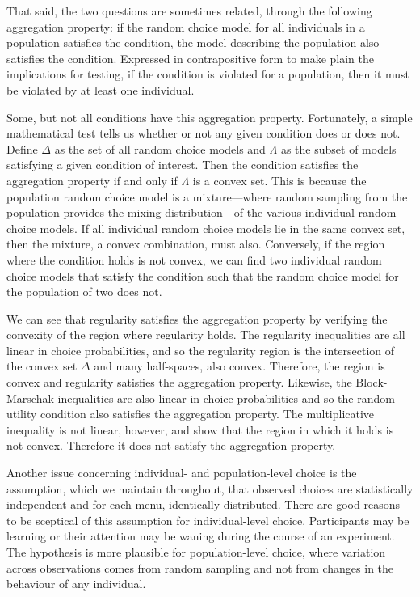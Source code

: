 \documentclass[11pt,letter]{article}
\newcommand{\menu}{menu}
\begin{document}
That said, the two questions are sometimes related, through the following aggregation property: if the random choice model for all individuals in a population satisfies the condition, the model describing the population also satisfies the condition.
Expressed in contrapositive form to make plain the implications for testing, if the condition is violated for a population, then it must be violated by at least one individual.

Some, but not all conditions have this aggregation property.
Fortunately, a simple mathematical test tells us whether or not any given condition does or does not.
Define $\Delta$ as the set of all random choice models and $\Lambda$ as the subset of models satisfying a given condition of interest.
Then the condition satisfies the aggregation property if and only if $\Lambda$ is a convex set.
This is because the population random choice model is a mixture---where random sampling from the population provides the mixing distribution---of the various individual random choice models.
If all individual random choice models lie in the same convex set, then the mixture, a convex combination, must also.
Conversely, if the region where the condition holds is not convex, we can find two individual random choice models that satisfy the condition such that the random choice model for the population of two does not.

We can see that regularity satisfies the aggregation property by verifying the convexity of the region where regularity holds.
The regularity inequalities are all linear in choice probabilities, and so the regularity region is the intersection of the convex set $\Delta$ and many half-spaces, also convex.
Therefore, the region is convex and regularity satisfies the aggregation property.
Likewise, the Block-Marschak inequalities are also linear in choice probabilities and so the random utility condition also satisfies the aggregation property.
The multiplicative inequality is not linear, however, and \citet{McCaMarl24} show that the region in which it holds is not convex.
Therefore it does not satisfy the aggregation property.

Another issue concerning individual- and population-level choice is the assumption, which we maintain throughout, that observed choices are statistically independent and for each \menu{}, identically distributed.
There are good reasons to be sceptical of this assumption for individual-level choice.
Participants may be learning or their attention may be waning during the course of an experiment.
The hypothesis is more plausible for population-level choice, where variation across observations comes from random sampling and not from changes in the behaviour of any individual.
\end{document}

